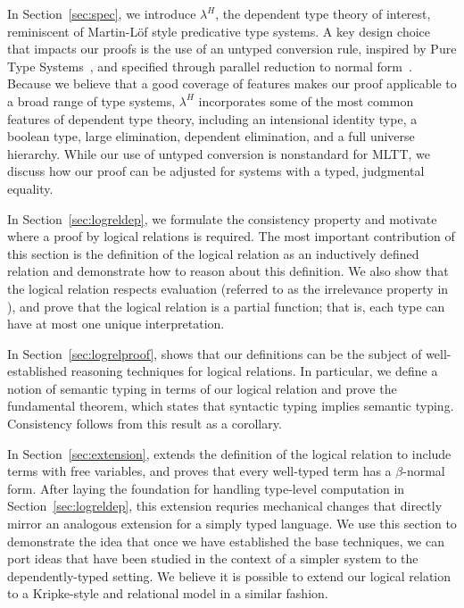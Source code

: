 \documentclass[acmsmall,screen=true,
\ifpublic review=false\else,review=true\fi
  ,anonymous=\ifanonymous true\else false\fi]{acmart}
\newcommand{\lang}{$\lambda^H$\xspace}
\begin{document}
In Section~\ref{sec:spec}, we introduce \lang{}, the dependent type theory of
interest, reminiscent of Martin-Löf style predicative type systems. A key
design choice that impacts our proofs is the use of an untyped conversion
rule, inspired by Pure Type Systems~\citet{barendregt1991introduction}, and
specified through parallel reduction to normal form~\citet{barendregt}.
Because we believe that a good coverage of features makes our proof applicable
to a broad range of type systems, \lang{} incorporates some of the most common
features of dependent type theory, including an intensional identity type, a
boolean type, large elimination, dependent elimination, and a full universe
hierarchy. While our use of untyped conversion is nonstandard for MLTT, we
discuss how our proof can be adjusted for systems with a typed, judgmental
equality.

In Section~\ref{sec:logreldep}, we formulate the consistency property and
motivate where a proof by logical relations is required. The most important
contribution of this section is the definition of the logical relation as an
inductively defined relation and demonstrate how to reason about this
definition. We also show that the logical relation respects evaluation
(referred to as the irrelevance property in \citet{martin-lof-a-la-coq}), and
prove that the logical relation is a partial function; that is, each type can
have at most one unique interpretation.

In Section~\ref{sec:logrelproof}, shows that our definitions can be the
subject of well-established reasoning techniques for logical relations. In
particular, we define a notion of semantic typing in terms of our logical
relation and prove the fundamental theorem, which states that syntactic typing
implies semantic typing. Consistency follows from this result as a corollary.

In Section~\ref{sec:extension}, extends the definition of the logical relation
to include terms with free variables, and proves that every well-typed term
has a $\beta$-normal form. After laying the foundation for handling type-level
computation in Section~\ref{sec:logreldep}, this extension requries mechanical
changes that directly mirror an analogous extension for a simply typed
language. We use this section to demonstrate the idea that once we have
established the base techniques, we can port ideas that have been studied in
the context of a simpler system to the dependently-typed setting.  We believe
it is possible to extend our logical relation to a Kripke-style and relational
model in a similar fashion.
\end{document}
